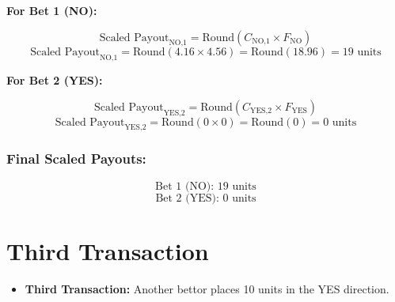 \documentclass{article}
\begin{document}
\textbf{For Bet 1 (NO):}

\[
\text{Scaled Payout}_{\text{NO,1}} = \text{Round}(C_{\text{NO,1}} \times F_{\text{NO}})
\]
\[
\text{Scaled Payout}_{\text{NO,1}} = \text{Round}(4.16 \times 4.56) = \text{Round}(18.96) = 19 \text{ units}
\]

\textbf{For Bet 2 (YES):}

\[
\text{Scaled Payout}_{\text{YES,2}} = \text{Round}(C_{\text{YES,2}} \times F_{\text{YES}})
\]
\[
\text{Scaled Payout}_{\text{YES,2}} = \text{Round}(0 \times 0) = \text{Round}(0) = 0 \text{ units}
\]

\subsubsection*{Final Scaled Payouts:}
\[
\text{Bet 1 (NO): } 19 \text{ units}
\]
\[
\text{Bet 2 (YES): } 0 \text{ units}
\]

\begin{center}
\end{center}


\begin{center}
\end{center}

\newpage

\section{Third Transaction}

\begin{itemize}
    \item \textbf{Third Transaction:} Another bettor places 10 units in the YES direction.
\end{itemize}
\end{document}
